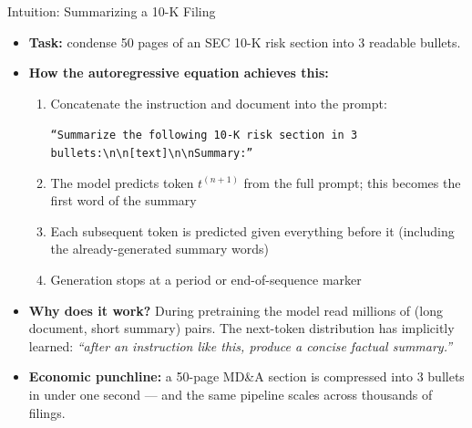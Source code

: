 \begin{frame}{Intuition: Summarizing a 10-K Filing}
\begin{itemize}
\item \textbf{Task:} condense 50 pages of an SEC 10-K risk section into 3 readable bullets.

\medskip
\item \textbf{How the autoregressive equation achieves this:}
\begin{enumerate}
    \item Concatenate the instruction and document into the prompt:
    \begin{center}
    \small\texttt{``Summarize the following 10-K risk section in 3 bullets:\textbackslash n\textbackslash n[text]\textbackslash n\textbackslash nSummary:''}
    \end{center}
    \item The model predicts token $t^{(n+1)}$ from the full prompt; this becomes the first word of the summary
    \item Each subsequent token is predicted given everything before it (including the already-generated summary words)
    \item Generation stops at a period or end-of-sequence marker
\end{enumerate}

\medskip
\item \textbf{Why does it work?} During pretraining the model read millions of (long document, short summary) pairs. The next-token distribution has implicitly learned: \emph{``after an instruction like this, produce a concise factual summary.''}

\medskip
\item \textbf{Economic punchline:} a 50-page MD\&A section is compressed into 3 bullets in under one second --- and the same pipeline scales across thousands of filings.
\end{itemize}
\end{frame}

